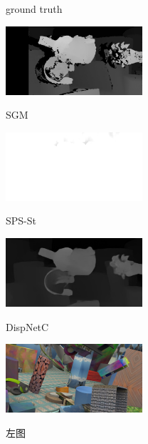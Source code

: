 \begin{figure}[!htb]
\begin{minipage}{0.3\linewidth}
		\vspace{-10pt}
		\centerline{ground truth}
	\end{minipage}
	\vfill
	\begin{minipage}{0.3\linewidth}
		\centerline{\includegraphics[width=2in]{figures/cmp_ft3d/sgm_005}}
		\vspace{-10pt}
		\centerline{SGM}
	\end{minipage}
	\hfill
	\begin{minipage}{0.3\linewidth}
		\centerline{\includegraphics[width=2in]{figures/cmp_ft3d/sps_005}}
		\vspace{-10pt}
		\centerline{SPS-St}
	\end{minipage}
	\hfill
	\begin{minipage}{0.3\linewidth}
	\centerline{\includegraphics[width=2in]{figures/cmp_ft3d/pred_005}}
	\vspace{-10pt}
	\centerline{DispNetC}
\end{minipage}
	\begin{minipage}{0.3\linewidth}
		\centerline{\includegraphics[width=2in]{figures/cmp_ft3d/l_039}}
		\vspace{-10pt}
		\centerline{左图}

\end{minipage}
\end{figure}
